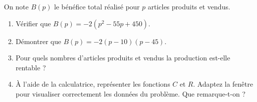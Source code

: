 \documentclass[11pt,openright,twoside,french]{book}
\begin{document}
On note $B(p)$ le bénéfice total réalisé pour $p$ articles produits et vendus.
\begin{enumerate}[resume]
    \item Vérifier que $B(p) = -2(p^2 - 55p + 450)$.
    \item Démontrer que $B(p) = -2(p - 10)(p - 45)$.
    \item Pour quels nombres d'articles produits et vendus la production est-elle rentable ?
    \item À l'aide de la calculatrice, représenter les fonctions $C$ et $R$. Adaptez la fenêtre pour visualiser correctement les données du problème. Que remarque-t-on ?
\end{enumerate}
\end{document}
